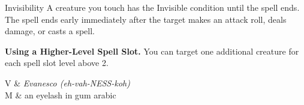 \begin{Spell}[
  tags=Concentration,
  level=2nd,
  time=1 Action,
  range=Touch,
  components={V, S, M},
  duration=1 Hour,
  school=Illusion,
  attack=None,
  effect=Invisible
]{Invisibility}
A creature you touch has the Invisible condition until the spell ends. The spell ends early immediately after the target makes an attack roll, deals damage, or casts a spell.

\textbf{Using a Higher-Level Spell Slot.} You can target one additional creature for each spell slot level above 2.

\begin{components}
V & \textit{Evanesco (eh-vah-NESS-koh)} \\
M & an eyelash in gum arabic
\end{components}
\end{Spell}


